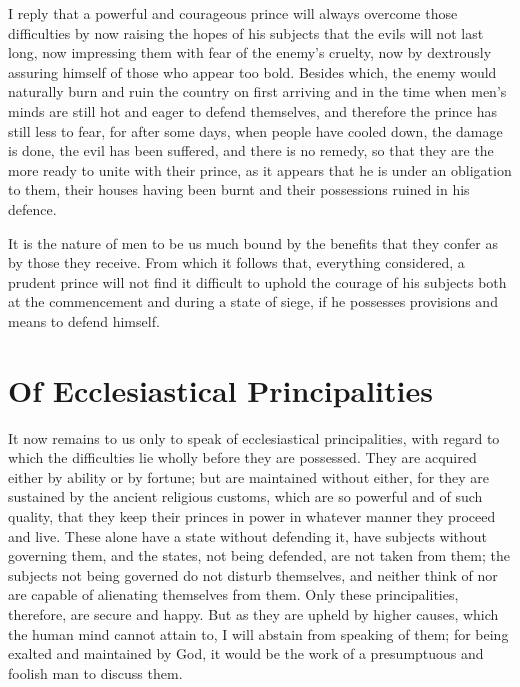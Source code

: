 \documentclass[12pt,letterpaper]{memoir}
\begin{document}
I reply that a powerful and courageous prince will always overcome
those difficulties by now raising the hopes of his subjects that the
evils will not last long, now impressing them with fear of the enemy's
cruelty, now by dextrously assuring himself of those who appear too
bold. Besides which, the enemy would naturally burn and ruin the
country on first arriving and in the time when men's minds are still
hot and eager to defend themselves, and therefore the prince has still
less to fear, for after some days, when people have cooled down, the
damage is done, the evil has been suffered, and there is no remedy, so
that they are the more ready to unite with their prince, as it appears
that he is under an obligation to them, their houses having been burnt
and their possessions ruined in his defence.

It is the nature of men to be us much bound by the benefits that they
confer as by those they receive. From which it follows that, everything
considered, a prudent prince will not find it difficult to uphold the
courage of his subjects both at the commencement and during a state of
siege, if he possesses provisions and means to defend himself.

\chapter{Of Ecclesiastical Principalities}

It now remains to us only to speak of ecclesiastical principalities,
with regard to which the difficulties lie wholly before they are
possessed. They are acquired either by ability or by fortune; but
are maintained without either, for they are sustained by the ancient
religious customs, which are so powerful and of such quality, that they
keep their princes in power in whatever manner they proceed and live.
These alone have a state without defending it, have subjects without
governing them, and the states, not being defended, are not taken from
them; the subjects not being governed do not disturb themselves, and
neither think of nor are capable of alienating themselves from them.
Only these principalities, therefore, are secure and happy. But as they
are upheld by higher causes, which the human mind cannot attain to, I
will abstain from speaking of them; for being exalted and maintained by
God, it would be the work of a presumptuous and foolish man to discuss
them.
\end{document}
